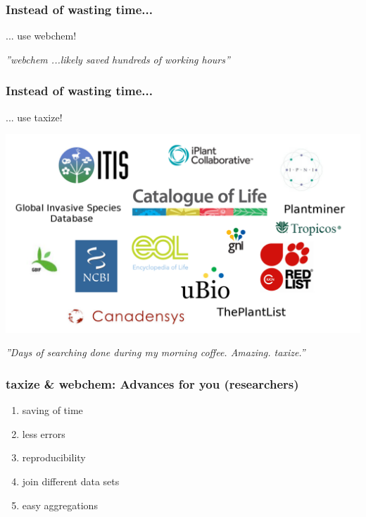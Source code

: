 \documentclass[
	10pt
	]{beamer}
\begin{document}
{%
\begin{frame}{}
\frametitle{Instead of wasting time...}
... use \alert{webchem}! \\
	\hspace*{2cm}
	\begin{adjustbox}{max totalsize={\textwidth}{0.8\textheight}}
				
	\end{adjustbox}

\pause
\vspace*{-1cm}\emph{''\alert{webchem} ...likely saved hundreds of working hours''}
\end{frame}
}


{%
\begin{frame}
\frametitle{Instead of wasting time...}
	... use \alert{taxize!} \\
		\hspace*{-2cm}
		\begin{center}
		\includegraphics[height=0.6\textheight]{figs/sources_taxize.png}
		\end{center}

	\pause
	\emph{''Days of searching done during my morning coffee. Amazing. \alert{taxize}.''}
\end{frame}
}


\begin{frame}
\frametitle{taxize \& webchem: Advances for you (researchers)}
	\begin{enumerate}
		\item saving of time %
		\item less errors
		\item reproducibility
		\item join different data sets
		\item easy aggregations
	\end{enumerate}
\end{frame}
\end{document}
